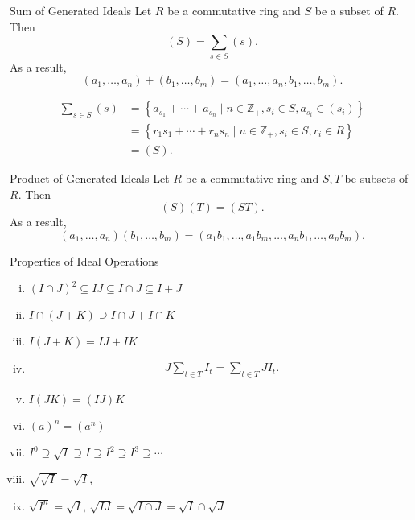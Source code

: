 \begin{proposition}{Sum of Generated Ideals}{}
    Let $R$ be a commutative ring and $S$ be a subset of $R$. Then 
    $$(S)=\sum_{s\in S}(s).$$ As a result,
    \[
    (a_1,\dots,a_n)+(b_1,\dots,b_m)=(a_1,\dots,a_n,b_1,\dots,b_m).
    \]
\end{proposition}

\begin{prf}
    \begin{align*}
        \sum_{s \in S} (s)&=\left\{a_{s_1}+ \cdots +a_{s_n}\mid n\in\mathbb{Z}_{+},s_i\in S,a_{s_i}\in (s_i)\right\}\\
        &=\left\{r_1s_{1}+ \cdots +r_ns_{n}\mid n\in\mathbb{Z}_{+},s_i\in S,r_i\in R\right\}\\
        &=(S).
    \end{align*}
\end{prf}

\begin{proposition}{Product of Generated Ideals}{}
    Let $R$ be a commutative ring and $S,T$ be subsets of $R$. Then 
    \[
        (S)(T)=(ST).
    \]
    As  a result,
    \[
        (a_1,\dots,a_n)(b_1,\dots,b_m)=(a_1b_1,\dots,a_1b_m,\dots,a_nb_1,\dots,a_nb_m).
    \]
\end{proposition}


\begin{proposition}{Properties of Ideal Operations}{}
    \begin{enumerate}[(i)]
        \item $(I\cap J)^2 \subseteq I J \subseteq I \cap J \subseteq I+J$
        \item ${I} \cap({J}+{K}) \supseteq {I} \cap {J}+{I} \cap {K}$
        \item ${I} ({J}+{K}) = {I}  {J}+{I}  {K}$
        \item $$
        \begin{gathered}
        J\sum_{t \in T} I_t=\sum_{t \in T} J I_t.
        \end{gathered}
        $$
        \item $I(J K)=(I J) K$
        \item $(a)^n=(a^n)$
        \item $I^0 \supseteq \sqrt{I} \supseteq I \supseteq I^2 \supseteq I^3 \supseteq \cdots$
        \item $\sqrt{\sqrt{I}} = \sqrt{I}$,
        \item $\sqrt{I^n}=\sqrt{I}$, $\sqrt{I J}=\sqrt{I \cap J}=\sqrt{I} \cap \sqrt{J}$
    \end{enumerate}
\end{proposition}

